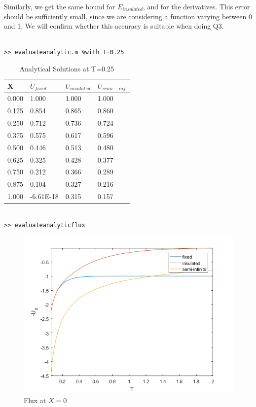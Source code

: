 \documentclass[10pt,a4paper]{report}
\begin{document}
Similarly, we get the same bound for $E_{insulated}$, and for the derivatives. This error should be sufficiently small, since we are considering a function varying between 0 and 1. We will confirm whether this accuracy is suitable when doing Q3.

\begin{verbatim}

>> evaluateanalytic.m %with T=0.25

\end{verbatim}

\begin{table}[h]
\centering
\begin{tabular}{|l|l|l|l|}
\hline
\textbf{X} & $U_{fixed}$  & $U_{insulated}$ & $U_{semi-inf}$ \\ \hline
0.000      & 1.000     & 1.000        & 1.000       \\ \hline
0.125      & 0.854     & 0.865        & 0.860       \\ \hline
0.250      & 0.712     & 0.736        & 0.724       \\ \hline
0.375      & 0.575     & 0.617        & 0.596       \\ \hline
0.500      & 0.446     & 0.513        & 0.480       \\ \hline
0.625      & 0.325     & 0.428        & 0.377       \\ \hline
0.750      & 0.212     & 0.366        & 0.289       \\ \hline
0.875      & 0.104     & 0.327        & 0.216       \\ \hline
1.000      & -6.61E-18 & 0.315        & 0.157       \\ \hline
\end{tabular}
\caption{Analytical Solutions at T=0.25}
\end{table}


\begin{verbatim}

>> evaluateanalyticflux 

\end{verbatim}

\begin{figure}[h]
\centering
\includegraphics{flux}
\caption{Flux at $X=0$}
\end{figure}
\end{document}
